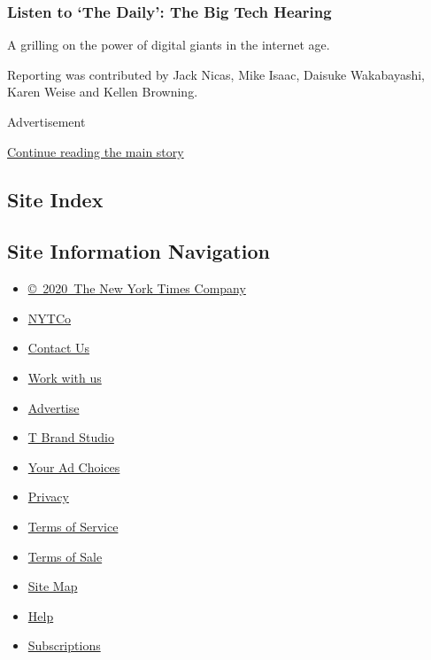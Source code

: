 \hypertarget{listen-to-the-daily-the-big-tech-hearing}{%
\subsubsection{Listen to `The Daily': The Big Tech
Hearing}\label{listen-to-the-daily-the-big-tech-hearing}}

A grilling on the power of digital giants in the internet age.

Reporting was contributed by Jack Nicas, Mike Isaac, Daisuke
Wakabayashi, Karen Weise and Kellen Browning.

Advertisement

\protect\hyperlink{after-bottom}{Continue reading the main story}

\hypertarget{site-index}{%
\subsection{Site Index}\label{site-index}}

\hypertarget{site-information-navigation}{%
\subsection{Site Information
Navigation}\label{site-information-navigation}}

\begin{itemize}
\tightlist
\item
  \href{https://help.nytimes.com/hc/en-us/articles/115014792127-Copyright-notice}{©~2020~The
  New York Times Company}
\end{itemize}

\begin{itemize}
\tightlist
\item
  \href{https://www.nytco.com/}{NYTCo}
\item
  \href{https://help.nytimes.com/hc/en-us/articles/115015385887-Contact-Us}{Contact
  Us}
\item
  \href{https://www.nytco.com/careers/}{Work with us}
\item
  \href{https://nytmediakit.com/}{Advertise}
\item
  \href{http://www.tbrandstudio.com/}{T Brand Studio}
\item
  \href{https://www.nytimes.com/privacy/cookie-policy\#how-do-i-manage-trackers}{Your
  Ad Choices}
\item
  \href{https://www.nytimes.com/privacy}{Privacy}
\item
  \href{https://help.nytimes.com/hc/en-us/articles/115014893428-Terms-of-service}{Terms
  of Service}
\item
  \href{https://help.nytimes.com/hc/en-us/articles/115014893968-Terms-of-sale}{Terms
  of Sale}
\item
  \href{https://spiderbites.nytimes.com}{Site Map}
\item
  \href{https://help.nytimes.com/hc/en-us}{Help}
\item
  \href{https://www.nytimes.com/subscription?campaignId=37WXW}{Subscriptions}
\end{itemize}
